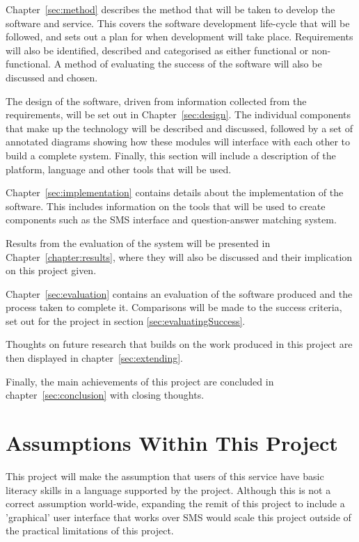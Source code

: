 \documentclass[authoryearcitations]{UoYCSproject}
\begin{document}
Chapter~\ref{sec:method} describes the method that will be taken to develop the software and service.  This covers the software development life-cycle that will be followed, and sets out a plan for when development will take place.  Requirements will also be identified, described and categorised  as either functional or non-functional.  A method of evaluating the success of the software will also be discussed and chosen.

The design of the software, driven from information collected from the requirements, will be set out in Chapter~\ref{sec:design}.  The individual components that make up the technology will be described and discussed, followed by a set of annotated diagrams showing how these modules will interface with each other to build a complete system.  Finally, this section will include a description of the platform, language and other tools that will be used.

Chapter~\ref{sec:implementation} contains details about the implementation of the software.  This includes information on the tools that will be used to create components such as the SMS interface and question-answer matching system.

Results from the evaluation of the system will be presented in Chapter~\ref{chapter:results}, where they will also be discussed and their implication on this project given.

Chapter~\ref{sec:evaluation} contains an evaluation of the software produced and the process taken to complete it.  Comparisons will be made to the success criteria, set out for the project in section \ref{sec:evaluatingSuccess}.

Thoughts on future research that builds on the work produced in this project are then displayed in chapter~\ref{sec:extending}.

Finally, the main achievements of this project are concluded in chapter~\ref{sec:conclusion} with closing thoughts.


\section{Assumptions Within This Project}
This project will make the assumption that users of this service have basic literacy skills in a language supported by the project.  Although this is not a correct assumption world-wide, expanding the remit of this project to include a 'graphical' user interface that works over SMS would scale this project outside of the practical limitations of this project.
\end{document}

